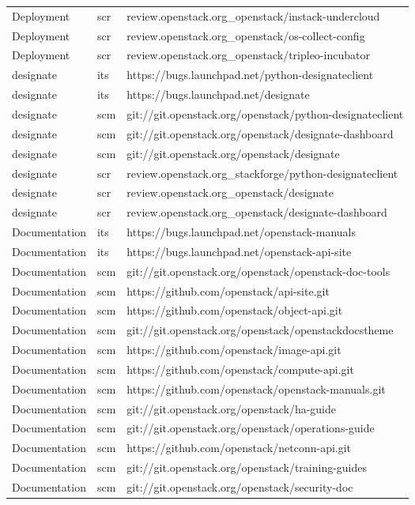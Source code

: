 \begin{center}
\begin{longtable}{|p{4cm}|p{1cm}|p{10cm}|}
Deployment&scr&review.openstack.org\_openstack/instack-undercloud\\ 
Deployment&scr&review.openstack.org\_openstack/os-collect-config\\ 
Deployment&scr&review.openstack.org\_openstack/tripleo-incubator\\ 
designate&its&https://bugs.launchpad.net/python-designateclient\\ 
designate&its&https://bugs.launchpad.net/designate\\ 
designate&scm&git://git.openstack.org/openstack/python-designateclient\\ 
designate&scm&git://git.openstack.org/openstack/designate-dashboard\\ 
designate&scm&git://git.openstack.org/openstack/designate\\ 
designate&scr&review.openstack.org\_stackforge/python-designateclient\\ 
designate&scr&review.openstack.org\_openstack/designate\\ 
designate&scr&review.openstack.org\_openstack/designate-dashboard\\ 
Documentation&its&https://bugs.launchpad.net/openstack-manuals\\ 
Documentation&its&https://bugs.launchpad.net/openstack-api-site\\ 
Documentation&scm&git://git.openstack.org/openstack/openstack-doc-tools\\ 
Documentation&scm&https://github.com/openstack/api-site.git\\ 
Documentation&scm&https://github.com/openstack/object-api.git\\ 
Documentation&scm&git://git.openstack.org/openstack/openstackdocstheme\\ 
Documentation&scm&https://github.com/openstack/image-api.git\\ 
Documentation&scm&https://github.com/openstack/compute-api.git\\ 
Documentation&scm&https://github.com/openstack/openstack-manuals.git\\ 
Documentation&scm&git://git.openstack.org/openstack/ha-guide\\ 
Documentation&scm&git://git.openstack.org/openstack/operations-guide\\ 
Documentation&scm&https://github.com/openstack/netconn-api.git\\ 
Documentation&scm&git://git.openstack.org/openstack/training-guides\\ 
Documentation&scm&git://git.openstack.org/openstack/security-doc\\ 

\end{longtable}
\end{center}
